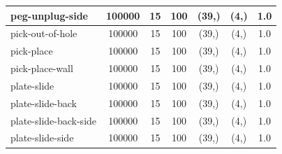 \documentclass{article}
\theoremstyle{plain}
\theoremstyle{definition}
\theoremstyle{remark}
\begin{document}
\begin{table}[]
{\begin{tabular}{|l|c|c|c|c|c|c|}
peg-unplug-side                     & 100000                                        & 15                                                   & 100                                             & (39,)                                           & (4,) & 1.0                                            \\ \hline
pick-out-of-hole                    & 100000                                        & 15                                                   & 100                                             & (39,)                                           & (4,) & 1.0                                            \\ \hline
pick-place                          & 100000                                        & 15                                                   & 100                                             & (39,)                                           & (4,) & 1.0                                            \\ \hline
pick-place-wall                     & 100000                                        & 15                                                   & 100                                             & (39,)                                           & (4,) & 1.0                                            \\ \hline
plate-slide                         & 100000                                        & 15                                                   & 100                                             & (39,)                                           & (4,) & 1.0                                            \\ \hline
plate-slide-back                    & 100000                                        & 15                                                   & 100                                             & (39,)                                           & (4,) & 1.0                                            \\ \hline
plate-slide-back-side               & 100000                                        & 15                                                   & 100                                             & (39,)                                           & (4,) & 1.0                                            \\ \hline
plate-slide-side                    & 100000                                        & 15                                                   & 100                                             & (39,)                                           & (4,) & 1.0                                            \\ \hline

\end{tabular}}
\end{table}
\end{document}
